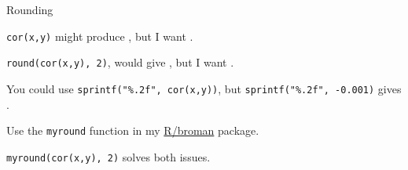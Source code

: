 \documentclass[12pt,t]{beamer}
\begin{document}
\begin{frame}{Rounding}

\vspace{24pt}

\bi
\itemsep18pt
\item {\tt cor(x,y)} might produce {\tt {}}, but
I want {\tt {}}.

\item {\tt round(cor(x,y), 2)}, would give {\tt {}}, but I want
{\tt {}}.

\item You could use {\tt sprintf("\%.2f", cor(x,y))}, but
{\tt sprintf("\%.2f", -0.001)} gives {\tt {}}.

\item Use the {\tt myround} function in my
\href{http://github.com/kbroman/broman}{R/broman} package.

\item {\tt myround(cor(x,y), 2)} solves both issues.
\ei

\end{frame}
\end{document}
